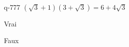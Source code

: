 \begin{truefalse}{q-777}
$(\sqrt{3}+1)(3+\sqrt{3})=6+4\sqrt{3}$
\item* Vrai
\item Faux
\end{truefalse}

